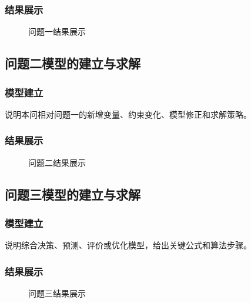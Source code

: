 \documentclass[12pt,a4paper]{article}
\begin{document}
\subsubsection{结果展示}

\begin{figure}[H]
    \centering
    \caption{问题一结果展示}
    \label{fig:q1-result}
\end{figure}

\subsection{问题二模型的建立与求解}

\subsubsection{模型建立}

说明本问相对问题一的新增变量、约束变化、模型修正和求解策略。

\subsubsection{结果展示}

\begin{figure}[H]
    \centering
    \caption{问题二结果展示}
    \label{fig:q2-result}
\end{figure}

\subsection{问题三模型的建立与求解}

\subsubsection{模型建立}

说明综合决策、预测、评价或优化模型，给出关键公式和算法步骤。

\subsubsection{结果展示}

\begin{figure}[H]
    \centering
    \caption{问题三结果展示}
    \label{fig:q3-result}
\end{figure}
\end{document}
